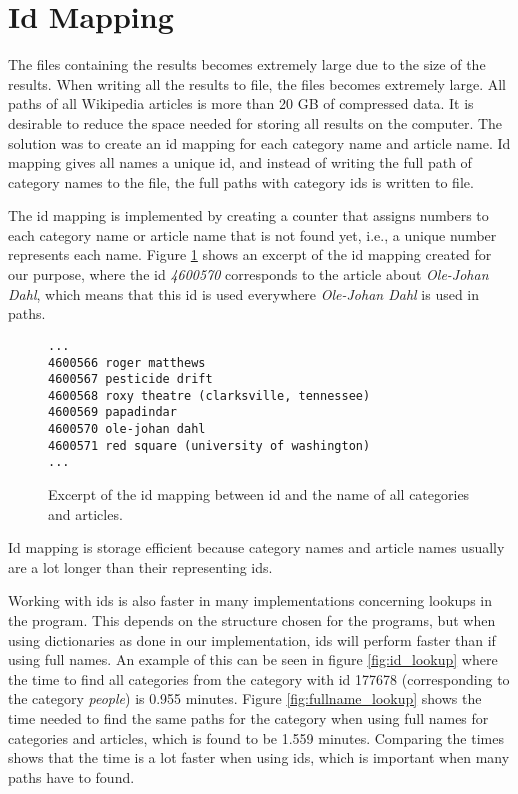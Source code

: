\section{Id Mapping}
The files containing the results becomes extremely large due to the size of the results. When writing all the results to file, the files becomes extremely large. All paths of all Wikipedia articles is more than 20 GB of compressed data. It is desirable to reduce the space needed for storing all results on the computer. The solution was to create an id mapping for each category name and article name. Id mapping gives all names a unique id, and instead of writing the full path of category names to the file, the full paths with category ids is written to file. 

The id mapping is implemented by creating a counter that assigns numbers to each category name or article name that is not found yet, i.e., a unique number represents each name. Figure \ref{fig:idmapping} shows an excerpt of the id mapping created for our purpose, where the id \emph{4600570} corresponds to the article about \emph{Ole-Johan Dahl}, which means that this id is used everywhere \emph{Ole-Johan Dahl} is used in paths. 

\begin{figure}[h]
\centering
\begin{lstlisting}
...
4600566 roger matthews
4600567 pesticide drift
4600568 roxy theatre (clarksville, tennessee)
4600569 papadindar
4600570 ole-johan dahl
4600571 red square (university of washington)
...
\end{lstlisting}
\caption[Id mapping example]{Excerpt of the id mapping between id and the name of all categories and articles.}
\label{fig:idmapping}
\end{figure}

Id mapping is storage efficient because category names and article names usually are a  lot longer than their representing ids. 

Working with ids is also faster in many implementations concerning lookups in the program. This depends on the structure chosen for the programs, but when using dictionaries as done in our implementation, ids will perform faster than if using full names. An example of this can be seen in figure \ref{fig:id_lookup} where the time to find all categories from the category with id 177678 (corresponding to the category \emph{people}) is 0.955 minutes. Figure \ref{fig:fullname_lookup} shows the time needed to find the same paths for the category when using full names for categories and articles, which is found to be 1.559 minutes. Comparing the times shows that the time is a lot faster when using ids, which is important when many paths have to found.

